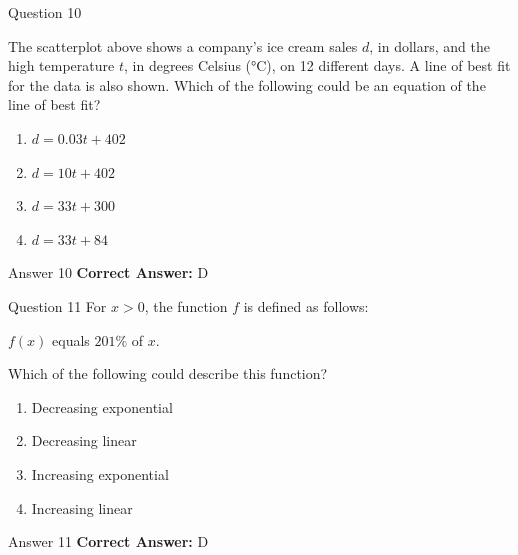 \documentclass{beamer}
\begin{document}
\begin{frame}{Question 10}
\small
\begin{center}

\end{center}

The scatterplot above shows a company’s ice cream sales $d$, in dollars, and the high temperature $t$, in degrees Celsius (°C), on 12 different days.  
A line of best fit for the data is also shown.  
Which of the following could be an equation of the line of best fit?
\vspace{0.35cm}
\begin{enumerate}
    \item[A.] $d = 0.03t + 402$
    \item[B.] $d = 10t + 402$
    \item[C.] $d = 33t + 300$
    \item[D.] $d = 33t + 84$
\end{enumerate}
\end{frame}
\begin{frame}{Answer 10}
\small
\textbf{Correct Answer:} D
\end{frame}

\begin{frame}{Question 11}
\small
For $x > 0$, the function $f$ is defined as follows:  
\begin{center}

$f(x)$ equals $201\%$ of $x$.
\end{center}

Which of the following could describe this function?
\vspace{0.35cm}
\begin{enumerate}
    \item[A.] Decreasing exponential
    \item[B.] Decreasing linear
    \item[C.] Increasing exponential
    \item[D.] Increasing linear
\end{enumerate}
\end{frame}
\begin{frame}{Answer 11}
\small
\textbf{Correct Answer:} D
\end{frame}
\end{document}
